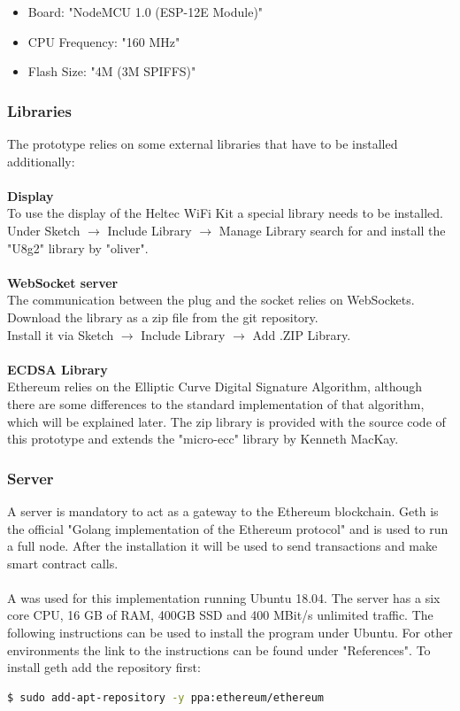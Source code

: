 \begin{itemize}
    \item Board: "NodeMCU 1.0 (ESP-12E Module)"
    \item CPU Frequency: "160 MHz"
    \item Flash Size: "4M (3M SPIFFS)"
\end{itemize}
\leavevmode

\subsubsection{Libraries}
The prototype relies on some external libraries that have to be installed additionally:
\\\\
\textbf{Display}\\
To use the display of the Heltec WiFi Kit a special library needs to be installed. Under Sketch $\rightarrow$ Include Library $\rightarrow$ Manage Library search for and install the "U8g2" library by "oliver".
\\\\
\textbf{WebSocket server}\\
The communication between the plug and the socket relies on WebSockets. Download the library as a zip file from the git repository\cite{websockets}.
\\
Install it via Sketch $\rightarrow$ Include Library $\rightarrow$ Add .ZIP Library.
\\\\
\textbf{ECDSA Library}\\
Ethereum relies on the Elliptic Curve Digital Signature Algorithm, although there are some differences to the standard implementation of that algorithm, which will be explained later. The zip library is provided with the source code of this prototype and extends the "micro-ecc" library by Kenneth MacKay\cite{micro-ecc}.
\\

\subsubsection{Server}
A server is mandatory to act as a gateway to the Ethereum blockchain. Geth is the official "Golang implementation of the Ethereum protocol"\cite{geth} and is used to run a full node. After the installation it will be used to send transactions and make smart contract calls.
\\\\
A  was used for this implementation running Ubuntu 18.04. The server has a six core CPU, 16 GB of RAM, 400GB SSD and 400 MBit/s unlimited traffic. The following instructions can be used to install the program under Ubuntu. For other environments the link to the instructions can be found under "References"\cite{geth-instructions}.
\newpage
To install geth add the repository first:
\begin{lstlisting}[language=bash]
  $ sudo add-apt-repository -y ppa:ethereum/ethereum
\end{lstlisting}

